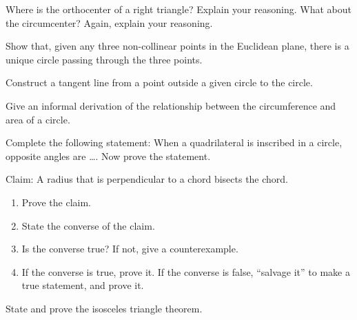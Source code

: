 
\begin{prob}
Where is the orthocenter of a right triangle?  Explain your reasoning.  What about the circumcenter?  Again, explain your reasoning.
\end{prob}

\begin{prob}
Show that, given any three non-collinear points in the Euclidean plane, there is a unique circle passing through the three points.
\end{prob}

\begin{prob}
Construct a tangent line from a point outside a given circle to the circle.
\end{prob}

\begin{prob}
Give an informal derivation of the relationship between the circumference and area of a circle. 
\end{prob}

\begin{prob}
Complete the following statement:  When a quadrilateral is inscribed in a circle, opposite angles are \dots. 
Now prove the statement.  
\end{prob}

\begin{prob}
Claim:  A radius that is perpendicular to a chord bisects the chord.
\begin{enumerate}
\item Prove the claim.
\item State the converse of the claim. 
\item Is the converse true?  If not, give a counterexample.  
\item If the converse is true, prove it.  If the converse is false, ``salvage it'' to make a true statement, and prove it.
\end{enumerate}
\end{prob}

\begin{prob}
State and prove the isosceles triangle theorem.
\end{prob}

